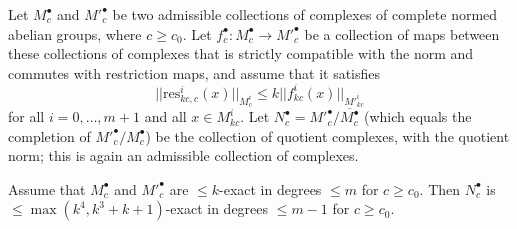 \begin{proposition}
  \label{snakelemma}
  Let $M^\bullet_c$ and $M'^\bullet_c$ be two admissible collections
  of complexes of complete normed abelian groups, where $c\geq c_0$.
  Let $f^\bullet_c: M^\bullet_c\to M'^\bullet_c$ be a collection of maps
  between these collections of complexes
  that is strictly compatible with the norm and commutes with restriction maps,
  and assume that it satisfies
  \[
  ||\mathrm{res}^i_{kc,c}(x)||_{M^i_c}\leq k||f^i_{kc}(x)||_{M'^i_{kc}}
  \]
  for all $i=0,\ldots,m+1$ and all $x\in M^i_{kc}$.
  Let $N^\bullet_c=M'^\bullet_c/\overline{M^\bullet_c}$
  (which equals the completion of $M'^{\bullet}_c/M^\bullet_c$)
  be the collection of quotient complexes, with the quotient norm;
  this is again an admissible collection of complexes.

  Assume that $M^\bullet_c$ and $M'^\bullet_c$ are $\leq k$-exact in degrees $\leq m$ for $c\geq c_0$.
  Then $N^\bullet_c$ is $\leq \max(k^4,k^3+k+1)$-exact in degrees $\leq m-1$ for $c\geq c_0$.
\end{proposition}

